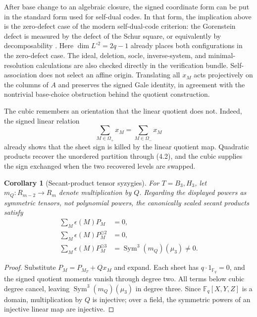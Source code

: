 \documentclass[11pt]{article}
\newtheorem{corollary}[theorem]{Corollary}
\theoremstyle{definition}
\theoremstyle{remark}
\newcommand{\F}{\mathbb{F}}
\begin{document}
After base change to an algebraic closure, the signed coordinate form can
be put in the standard form used for self-dual codes.  In that form, the
implication above is the zero-defect case of the modern self-dual-code
criterion: the Gorenstein defect is measured by the
defect of the Schur square, or equivalently by decomposability
\cite[Theorem~3.11 and Corollaries~3.12--3.13]{RodriguezPajaresEtAl2025}.  Here
\(\dim L^{\circ2}=2q-1\) already places both configurations in the
zero-defect case.  The ideal, deletion, socle, inverse-system, and
minimal-resolution calculations are also checked directly in the
verification bundle.
Self-association does not select an affine origin.  Translating all
\(x_M\) acts projectively on the columns of \(A\) and preserves the
signed Gale identity, in agreement with the nontrivial base-choice
obstruction behind the quotient construction.

The cubic remembers an orientation that the linear quotient does not.
Indeed, the signed linear relation
\[
 \sum_{M\in\Omega_+}x_M=\sum_{M\in\Omega_-}x_M
\]
already shows that the sheet sign is killed by the linear
quotient map.  Quadratic products recover the unordered
partition through (4.2), and the cubic supplies the sign exchanged when
the two recovered levels are swapped.

\begin{corollary}[Secant-product tensor syzygies]
\label{cor:secant-product-syzygies}
For \(T=B_3,H_3\), let \(m_Q:R_{m-2}\to R_m\) denote multiplication
by \(Q\).  Regarding the displayed powers as symmetric tensors, not
polynomial powers, the canonically scaled secant products satisfy
\[
\begin{aligned}
\sum_M\epsilon(M)P_M&=0,\\
\sum_M\epsilon(M)P_M^{\odot2}&=0,\\
\sum_M\epsilon(M)P_M^{\odot3}
  &=\operatorname{Sym}^3(m_Q)(\mu_3)\ne0.
\end{aligned}                                               \tag{4.7}
\]
\end{corollary}

\begin{proof}
Substitute \(P_M=P_{M_T}+Qx_M\) and expand.  Each sheet has
\(q\cdot1_{\F_q}=0\), and the signed quotient moments vanish
through degree two.  All terms below cubic degree cancel, leaving
\(\operatorname{Sym}^3(m_Q)(\mu_3)\) in degree three.  Since
\(\F_q[X,Y,Z]\) is a domain, multiplication by \(Q\) is injective;
over a field, the symmetric powers of an injective linear map are
injective.
\end{proof}
\end{document}
